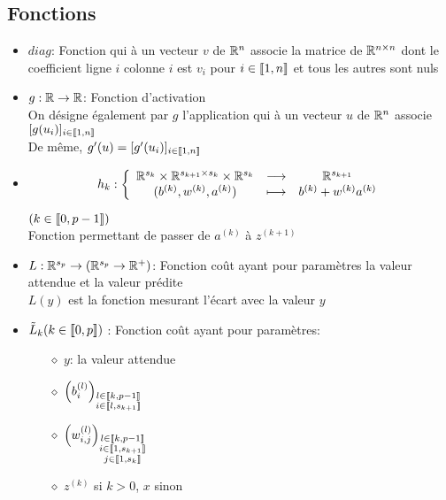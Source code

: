 \subsection{Fonctions}
	
	\begin{itemize}
		\item $diag$: Fonction qui à un vecteur $v$ de $\mathbb{R}^n$ associe la matrice de $\mathbb{R}^{n\times n}$ dont le coefficient ligne $i$ colonne $i$ est $v_i$ pour $i\in\left\llbracket1, n\right\rrbracket$ et tous les autres sont nuls\\
		
		\item $g:\mathbb{R}\rightarrow\mathbb{R}$: Fonction d'activation\\
		
		      On désigne également par $g$ l'application qui à un vecteur $u$ de $\mathbb{R}^{n}$ associe $[g(u_i)]_{i\in\left\llbracket1, n\right\rrbracket}$\\
					De même, $g'(u) = [g'(u_i)]_{i\in\left\llbracket1, n\right\rrbracket}$\\
					
		\item \[h_k: \left\{\begin{array}{ccc} \mathbb{R}^{s_k}\times\mathbb{R}^{s_{k+1}\times s_k}\times\mathbb{R}^{s_k} & \longrightarrow & \mathbb{R}^{s_{k+1}} \\ (b^{(k)}, w^{(k)}, a^{(k)}) & \longmapsto & b^{(k)} + w^{(k)}a^{(k)} \end{array} \right.\]
							
					$(k\in\left\llbracket0, p - 1\right\rrbracket)$\\
					Fonction permettant de passer de $a^{(k)}$ à $z^{(k+1)}$\\
					
		\item $L: \mathbb{R}^{s_p}\rightarrow\left(\mathbb{R}^{s_p}\rightarrow\mathbb{R}^+\right)$: Fonction coût ayant pour paramètres la valeur attendue et la valeur prédite\\
		$L(y)$ est la fonction mesurant l'écart avec la valeur $y$\\
		
		\item $\tilde{L}_k (k\in\left\llbracket0, p\right\rrbracket)$ : Fonction coût ayant pour paramètres:
			    \begin{itemize}
						\item[$\diamond$] $y$: la valeur attendue\\
						\item[$\diamond$] $\left(b^{(l)}_i\right)_{\substack{l\in\left\llbracket k, p-1\right\rrbracket\\
																									              {i\in\left\llbracket l, s_{k+1}\right\rrbracket}}}$\\
						\item[$\diamond$] $\left(w^{(l)}_{i, j}\right)_{\substack{l\in\left\llbracket k, p-1\right\rrbracket\\
																												{i\in\left\llbracket1, s_{k+1}\right\rrbracket}\\
																												{j\in\left\llbracket1, s_k\right\rrbracket}}}$\\
						\item[$\diamond$] $z^{(k)}$ si $k > 0$, $x$ sinon\\
					\end{itemize}
					

\end{itemize}
